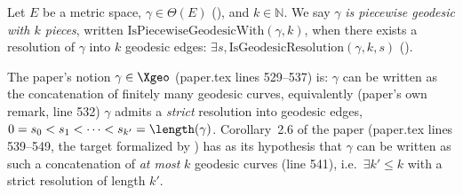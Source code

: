 \begin{definition}
  Let $E$ be a metric space, $\gamma \in \Theta(E)$ (), and $k \in \mathbb{N}$. We say
  $\gamma$ \emph{is piecewise geodesic with $k$ pieces}, written
  $\mathrm{IsPiecewiseGeodesicWith}(\gamma,k)$, when there exists a resolution of $\gamma$ into $k$
  geodesic edges: $\exists s, \mathrm{IsGeodesicResolution}(\gamma,k,s)$
  ().

  The paper's notion $\gamma \in \Xgeo$ (paper.tex lines 529--537) is: $\gamma$ can be written as
  the concatenation of finitely many geodesic curves, equivalently (paper's own remark, line 532)
  $\gamma$ admits a \emph{strict} resolution into geodesic edges,
  $0 = s_0 < s_1 < \dots < s_{k'} = \length(\gamma)$. Corollary~2.6 of the paper (paper.tex lines
  539--549, the target formalized by ) has as its hypothesis that $\gamma$ can
  be written as such a concatenation of \emph{at most} $k$ geodesic curves (line 541), i.e.\
  $\exists k' \le k$ with a strict resolution of length $k'$.


\end{definition}
